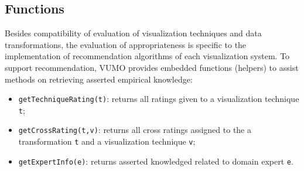 \documentclass[]{interact}
\theoremstyle{plain}%
\theoremstyle{definition}
\theoremstyle{remark}
\theoremstyle{definition}
\begin{document}






\subsection{Functions}

Besides compatibility of evaluation of visualization techniques and data transformations, the evaluation of appropriateness is specific to the implementation of recommendation algorithms of each visualization system. To support recommendation, VUMO provides embedded functions (helpers) to assist methods on retrieving asserted empirical knowledge:

\begin{itemize}
    \item \texttt{getTechniqueRating(t)}: returns all ratings given to a visualization technique \texttt{t};
    \item \texttt{getCrossRating(t,v)}: returns all cross ratings assigned to the a transformation \texttt{t} and a visualization technique \texttt{v};
    \item \texttt{getExpertInfo(e)}: returns asserted knowledged related to domain expert \texttt{e}.
\end{itemize}
\end{document}
